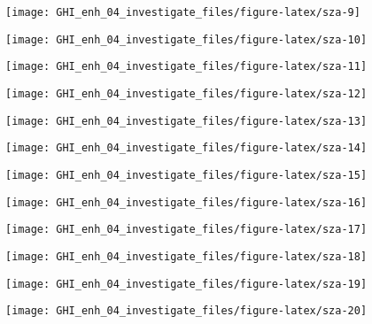 \documentclass[
  10pt,
  a4paper,oneside]{article}
\begin{document}
\begin{center}\texttt{[image: GHI\_enh\_04\_investigate\_files/figure-latex/sza-9]} \end{center}

\begin{center}\texttt{[image: GHI\_enh\_04\_investigate\_files/figure-latex/sza-10]} \end{center}

\begin{center}\texttt{[image: GHI\_enh\_04\_investigate\_files/figure-latex/sza-11]} \end{center}

\begin{center}\texttt{[image: GHI\_enh\_04\_investigate\_files/figure-latex/sza-12]} \end{center}

\begin{center}\texttt{[image: GHI\_enh\_04\_investigate\_files/figure-latex/sza-13]} \end{center}

\begin{center}\texttt{[image: GHI\_enh\_04\_investigate\_files/figure-latex/sza-14]} \end{center}

\begin{center}\texttt{[image: GHI\_enh\_04\_investigate\_files/figure-latex/sza-15]} \end{center}

\begin{center}\texttt{[image: GHI\_enh\_04\_investigate\_files/figure-latex/sza-16]} \end{center}

\begin{center}\texttt{[image: GHI\_enh\_04\_investigate\_files/figure-latex/sza-17]} \end{center}

\begin{center}\texttt{[image: GHI\_enh\_04\_investigate\_files/figure-latex/sza-18]} \end{center}

\begin{center}\texttt{[image: GHI\_enh\_04\_investigate\_files/figure-latex/sza-19]} \end{center}

\begin{center}\texttt{[image: GHI\_enh\_04\_investigate\_files/figure-latex/sza-20]} \end{center}
\end{document}
